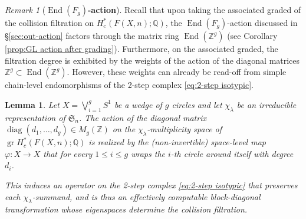 \documentclass[12pt]{article}
\newcommand{\Q}{\mathbb{Q}}
\newcommand{\SymGroup}[1][n]{\mathfrak{S}_{#1}}
\newcommand{\Specht}[1]{\chi_{#1}}
\DeclareMathOperator{\End}{End}
\DeclareMathOperator{\gr}{gr}
\theoremstyle{plain}
\newtheorem{lem}[thm]{Lemma}
\theoremstyle{definition}
\theoremstyle{remark}
\newtheorem{rmk}[thm]{Remark}
\begin{document}
\begin{rmk}[\textbf{$\End(F_g)$-action}]

Recall that upon taking the associated graded of the collision filtration on $H^*_c(F(X,n);\Q)$, the $\End(F_g)$-action discussed in \S\ref{sec:out-action} factors through the matrix ring $\End(\mathbb{Z}^g)$ (see Corollary \ref{prop:GL action after grading}). Furthermore, on the associated graded, the filtration degree is exhibited by the weights of the action of the diagonal matrices $\mathbb{Z}^g \subset \End(\mathbb{Z}^g)$. However, these weights can already be read-off from simple chain-level endomorphisms of the 2-step complex \eqref{eq:2-step isotypic}.
\end{rmk}

\begin{lem}
Let $X= \bigvee_{i=1}^g S^1$ be a wedge of $g$ circles and let $\Specht{\lambda}$ be an irreducible representation of $\SymGroup$. The action of the diagonal matrix $\operatorname{diag}(d_1,\ldots,d_g) \in M_g(\mathbb{Z})$ on the $\Specht{\lambda}$-multiplicity space of $\gr H^*_c(F(X,n);\Q)$ is realized by the (non-invertible) space-level map $\varphi: X\to X$ that for every $1\leq i \leq g$ wraps the $i$-th circle around itself with degree $d_i$.

This induces an operator on the 2-step complex \eqref{eq:2-step isotypic} that preserves each $\Specht{\lambda}$-summand, and is thus an effectively computable block-diagonal transformation whose eigenspaces determine the collision filtration.



\end{lem}
\end{document}
